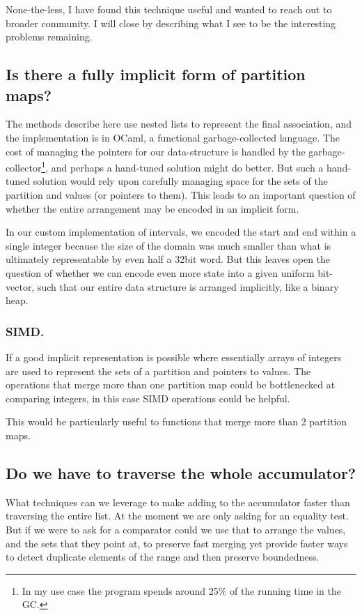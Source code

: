 \documentclass{article}
\begin{document}
None-the-less, I have found this technique useful and wanted to reach out to
broader community.
I will close by describing what I see to be the interesting problems remaining.

\subsection{Is there a fully implicit form of partition maps?}

The methods describe here use nested lists to represent the final association,
and the implementation is in OCaml\cite{ocaml-manual},
a functional garbage-collected language.
The cost of managing the pointers for our data-structure is handled by the
garbage-collector\footnote{In my use case the program spends around 25\% of the running time in the GC.},
and perhaps a hand-tuned solution might do better.
But such a hand-tuned solution would rely upon carefully managing space for
the sets of the partition and values (or pointers to them).
This leads to an important question of whether the entire arrangement may be
encoded in an implicit form.

In our custom implementation of intervals, we encoded the start and end
within a single integer because the size of the domain was much smaller
than what is ultimately representable by even half a 32bit word.
But this leaves open the question of whether we can encode even more state
into a given uniform bit-vector,
such that our entire data structure is arranged implicitly,
like a binary heap.

\subsubsection{SIMD.}

If a good implicit representation is possible where essentially arrays of
integers are used to represent the sets of a partition and pointers to values.
The operations that merge more than one partition map could be bottlenecked
at comparing integers,
in this case SIMD operations could be helpful.

This would be particularly useful to functions that merge more than 2
partition maps.

\subsection{Do we have to traverse the whole accumulator?}

What techniques can we leverage to make adding to the accumulator
faster than traversing the entire list.
At the moment we are only asking for an equality test.
But if we were to ask for a comparator could we use that to arrange the values,
and the sets that they point at,
to preserve fast merging yet provide faster ways to detect duplicate elements
of the range and then preserve boundedness.
\end{document}
